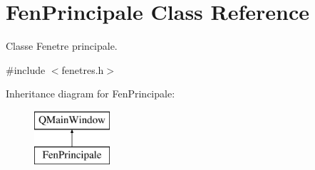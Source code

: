 \hypertarget{class_fen_principale}{}\section{Fen\+Principale Class Reference}
\label{class_fen_principale}


Classe Fenetre principale.  




{\ttfamily \#include $<$fenetres.\+h$>$}

Inheritance diagram for Fen\+Principale\+:\begin{figure}[H]
\begin{center}
\leavevmode
\includegraphics[height=2.000000cm]{class_fen_principale}
\end{center}
\end{figure}
